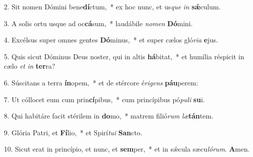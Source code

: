 \item 2. Sit nomen Dómini bene\textbf{dí}ctum,~* ex hoc nunc, et us\hspace{0.02em}\textit{que} \textit{in} \textbf{sǽ}culum.
\item 3. A solis ortu usque ad oc\textbf{cá}sum,~* laudábile \textit{nomen} \textbf{Dó}mini.
\item 4. Excélsus super omnes gentes \textbf{Dó}minus,~* et super cælos gló\textit{ria} \textbf{e}jus.
\item 5. Quis sicut Dóminus Deus noster, qui in altis \textbf{há}bitat,~* et humília réspicit in cælo \textit{et} \textit{in} \textbf{ter}ra?
\item 6. Súscitans a terra \textbf{ín}opem,~* et de stércore é\textit{rigens} \textbf{páu}perem:
\item 7. Ut cóllocet eum cum prin\textbf{cí}pibus,~* cum princípibus pó\textit{puli} \textbf{su}i.
\item 8. Qui habitáre facit stérilem in \textbf{do}mo,~* matrem filió\textit{rum} \textit{læ}\textbf{tán}tem.
\item 9. Glória Patri, et \textbf{Fí}lio,~* et Spirí\textit{tui} \textbf{San}cto.
\item 10. Sicut erat in princípio, et nunc, et \textbf{sem}per,~* et in sǽcula sæcu\hspace{0.02em}\textit{lórum}. \textbf{A}men.


